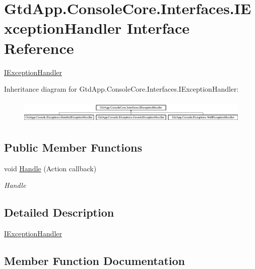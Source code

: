 \hypertarget{interface_gtd_app_1_1_console_core_1_1_interfaces_1_1_i_exception_handler}{}\section{Gtd\+App.\+Console\+Core.\+Interfaces.\+I\+Exception\+Handler Interface Reference}
\label{interface_gtd_app_1_1_console_core_1_1_interfaces_1_1_i_exception_handler}


\mbox{\hyperlink{interface_gtd_app_1_1_console_core_1_1_interfaces_1_1_i_exception_handler}{I\+Exception\+Handler}}  


Inheritance diagram for Gtd\+App.\+Console\+Core.\+Interfaces.\+I\+Exception\+Handler\+:\begin{figure}[H]
\begin{center}
\leavevmode
\includegraphics[height=1.141692cm]{interface_gtd_app_1_1_console_core_1_1_interfaces_1_1_i_exception_handler}
\end{center}
\end{figure}
\subsection*{Public Member Functions}
\begin{DoxyCompactItemize}
\item 
void \mbox{\hyperlink{interface_gtd_app_1_1_console_core_1_1_interfaces_1_1_i_exception_handler_a4d0af5418cd0b240e5e1e437e2b571d9}{Handle}} (Action callback)
\begin{DoxyCompactList}\small\item\em Handle \end{DoxyCompactList}\end{DoxyCompactItemize}


\subsection{Detailed Description}
\mbox{\hyperlink{interface_gtd_app_1_1_console_core_1_1_interfaces_1_1_i_exception_handler}{I\+Exception\+Handler}} 



\subsection{Member Function Documentation}
\mbox{\label{interface_gtd_app_1_1_console_core_1_1_interfaces_1_1_i_exception_handler_a4d0af5418cd0b240e5e1e437e2b571d9}} 
